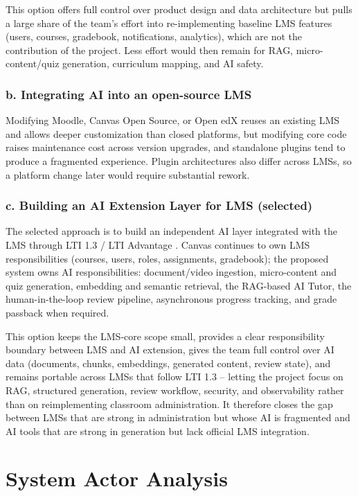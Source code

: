 This option offers full control over product design and data
architecture but pulls a large share of the team's effort into
re-implementing baseline LMS features (users, courses, gradebook,
notifications, analytics), which are not the contribution of the
project. Less effort would then remain for RAG, micro-content/quiz
generation, curriculum mapping, and AI safety.

\subsubsection*{b. Integrating AI into an open-source LMS}

Modifying Moodle, Canvas Open Source, or Open edX reuses an existing
LMS and allows deeper customization than closed platforms, but
modifying core code raises maintenance cost across version upgrades,
and standalone plugins tend to produce a fragmented experience.
Plugin architectures also differ across LMSs, so a platform change
later would require substantial rework.

\subsubsection*{c. Building an AI Extension Layer for LMS (selected)}

The selected approach is to build an independent AI layer integrated
with the LMS through LTI 1.3 / LTI Advantage
\cite{lti-advantage}. Canvas continues to own LMS responsibilities
(courses, users, roles, assignments, gradebook); the proposed system
owns AI responsibilities: document/video ingestion, micro-content and
quiz generation, embedding and semantic retrieval, the RAG-based AI
Tutor, the human-in-the-loop review pipeline, asynchronous progress
tracking, and grade passback when required.

This option keeps the LMS-core scope small, provides a clear
responsibility boundary between LMS and AI extension, gives the team
full control over AI data (documents, chunks, embeddings, generated
content, review state), and remains portable across LMSs that follow
LTI 1.3 -- letting the project focus on RAG, structured generation,
review workflow, security, and observability rather than on
reimplementing classroom administration. It therefore closes the gap
between LMSs that are strong in administration but whose AI is
fragmented and AI tools that are strong in generation but lack
official LMS integration.

\section{System Actor Analysis}
\label{sec:phan-tich-tac-nhan-he-thong}

